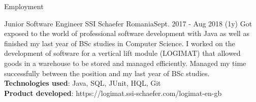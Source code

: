 \documentclass[]{mcdowellcv}
\begin{document}
\begin{cvsection}{Employment}
		\begin{cvsubsection}{Junior Software Engineer }{SSI Schaefer Romania}{Sept. 2017 - Aug 2018 (1y)}
          Got exposed to the world of professional software development with Java as well as finished my last year of BSc studies in Computer Science. I worked on the development of software for a vertical lift module (LOGIMAT) that allowed goods in a warehouse to be stored and managed efficiently. Managed my time successfully between the position and my last year of BSc studies.
      		\\ \textbf{Technologies used}: Java, SQL, JUnit, HQL, Git
		    \\ \textbf{Product developed}: https://logimat.ssi-schaefer.com/logimat-en-gb
		\end{cvsubsection}
		
  \end{cvsection}
\end{document}
